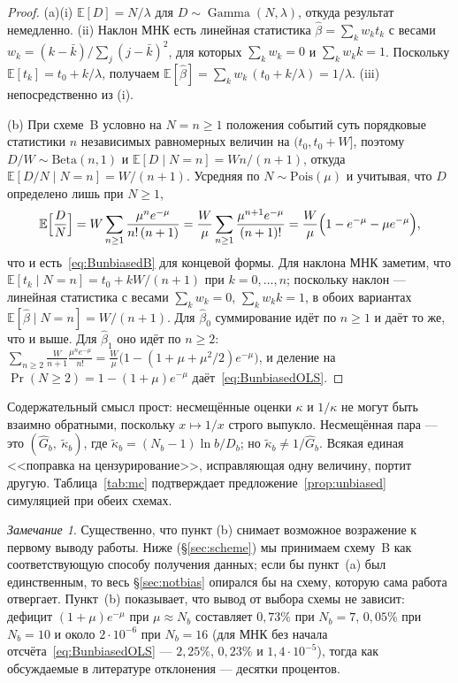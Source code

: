 \documentclass[11pt,a4paper]{article}
\theoremstyle{plain}
\theoremstyle{remark}
\newtheorem{remark}{Замечание}
\DeclareMathOperator{\Gam}{Gamma}
\begin{document}
\begin{proof}
(a)(i) $\mathbb E[D]=N/\lambda$ для $D\sim\Gam(N,\lambda)$, откуда результат немедленно.
(ii) Наклон МНК есть линейная статистика $\hat\beta=\sum_k w_k t_k$ с весами
$w_k=(k-\bar k)/\sum_j(j-\bar k)^2$, для которых $\sum_k w_k=0$ и $\sum_k w_k k=1$.
Поскольку $\mathbb E[t_k]=t_0+k/\lambda$, получаем
$\mathbb E[\hat\beta]=\sum_k w_k\,(t_0+k/\lambda)=1/\lambda$.
(iii) непосредственно из (i).

(b) При схеме~B условно на $N=n\ge1$ положения событий суть порядковые статистики
$n$ независимых равномерных величин на $(t_0,t_0+W]$, поэтому $D/W\sim\mathrm{Beta}(n,1)$
и $\mathbb E[D\mid N=n]=Wn/(n+1)$, откуда $\mathbb E[D/N\mid N=n]=W/(n+1)$. Усредняя по
$N\sim\mathrm{Pois}(\mu)$ и учитывая, что $D$ определено лишь при $N\ge1$,
\[
\mathbb E\Bigl[\frac{D}{N}\Bigr]
=W\sum_{n\ge1}\frac{\mu^{n}e^{-\mu}}{n!\,(n+1)}
=\frac{W}{\mu}\sum_{n\ge1}\frac{\mu^{n+1}e^{-\mu}}{(n+1)!}
=\frac{W}{\mu}\Bigl(1-e^{-\mu}-\mu e^{-\mu}\Bigr),
\]
что и есть~\eqref{eq:BunbiasedB} для концевой формы. Для наклона МНК заметим, что
$\mathbb E[t_k\mid N=n]=t_0+kW/(n+1)$ при $k=0,\dots,n$; поскольку наклон ---
линейная статистика с весами $\sum_kw_k=0$, $\sum_kw_kk=1$, в обоих вариантах
$\mathbb E[\hat\beta\mid N=n]=W/(n+1)$. Для $\hat\beta_0$ суммирование идёт по
$n\ge1$ и даёт то же, что и выше. Для $\hat\beta_1$ оно идёт по $n\ge2$:
$\sum_{n\ge2}\frac{W}{n+1}\frac{\mu^ne^{-\mu}}{n!}
=\frac{W}{\mu}\bigl(1-(1+\mu+\mu^2/2)e^{-\mu}\bigr)$, и деление на
$\Pr(N\ge2)=1-(1+\mu)e^{-\mu}$ даёт~\eqref{eq:BunbiasedOLS}.
\end{proof}

Содержательный смысл прост: несмещённые оценки $\kappa$ и $1/\kappa$ не могут быть
взаимно обратными, поскольку $x\mapsto1/x$ строго выпукло. Несмещённая пара --- это
$(\hat G_b,\ \tilde\kappa_b)$, где $\tilde\kappa_b=(N_b-1)\ln b/D_b$; но
$\tilde\kappa_b\ne1/\hat G_b$. Всякая единая <<поправка на цензурирование>>,
исправляющая одну величину, портит другую. Таблица~\ref{tab:mc} подтверждает
предложение~\ref{prop:unbiased} симуляцией при обеих схемах.

\begin{remark}\label{rem:schemeindep}
Существенно, что пункт (b) снимает возможное возражение к первому выводу работы.
Ниже (\S\ref{sec:scheme}) мы принимаем схему~B как соответствующую способу
получения данных; если бы пункт~(a) был единственным, то весь \S\ref{sec:notbias}
опирался бы на схему, которую сама работа отвергает. Пункт~(b) показывает, что
вывод от выбора схемы не зависит: дефицит $(1+\mu)e^{-\mu}$ при $\mu\approx N_b$
составляет $0{,}73\%$ при $N_b=7$, $0{,}05\%$ при $N_b=10$ и около $2\cdot10^{-6}$ при
$N_b=16$ (для МНК без начала отсчёта~\eqref{eq:BunbiasedOLS} --- $2{,}25\%$,
$0{,}23\%$ и $1{,}4\cdot10^{-5}$), тогда как обсуждаемые в литературе отклонения ---
десятки процентов.
\end{remark}
\end{document}
